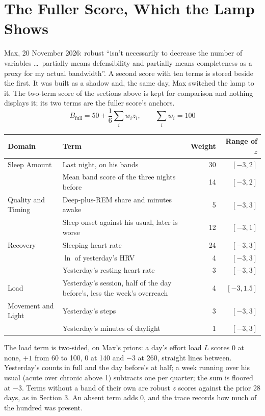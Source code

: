 \documentclass[11pt]{article}
\begin{document}
\section{The Fuller Score, Which the Lamp Shows}\label{sec:full}
Max, 20 November 2026: robust ``isn't necessarily to decrease the number of
variables \dots\ partially means defensibility and partially means completeness
as a proxy for my actual bandwidth''. A second score with ten terms is stored
beside the first. It was built as a shadow and, the same day, Max switched the
lamp to it. The two-term score of the sections above is kept for comparison and
nothing displays it; its two terms are the fuller score's anchors.
\begin{equation}
B_{\text{full}} = 50 + \frac{1}{6} \sum_i w_i z_i, \qquad \sum_i w_i = 100
\end{equation}
\begin{center}
\begin{tabular}{L{0.20\textwidth}L{0.47\textwidth}rr}
\toprule
Domain & Term & Weight & Range of $z$ \\
\midrule
Sleep Amount & Last night, on his bands & 30 & $[-3, 2]$ \\
 & Mean band score of the three nights before & 14 & $[-3, 2]$ \\
Quality and Timing & Deep-plus-REM share and minutes awake & 5 & $[-3, 3]$ \\
 & Sleep onset against his usual, later is worse & 12 & $[-3, 1]$ \\
Recovery & Sleeping heart rate & 24 & $[-3, 3]$ \\
 & $\ln$ of yesterday's HRV & 4 & $[-3, 3]$ \\
 & Yesterday's resting heart rate & 3 & $[-3, 3]$ \\
Load & Yesterday's session, half of the day before's, less the week's overreach & 4 & $[-3, 1.5]$ \\
Movement and Light & Yesterday's steps & 3 & $[-3, 3]$ \\
 & Yesterday's minutes of daylight & 1 & $[-3, 3]$ \\
\bottomrule
\end{tabular}
\end{center}
The load term is two-sided, on Max's priors: a day's effort load $L$ scores 0
at none, $+1$ from 60 to 100, 0 at 140 and $-3$ at 260, straight lines between.
Yesterday's counts in full and the day before's at half; a week running over
his usual (acute over chronic above 1) subtracts one per quarter; the sum is
floored at $-3$. Terms without a band of their own are robust $z$ scores against the prior 28
days, as in Section 3. An absent term adds 0, and the trace records how much of
the hundred was present.
\end{document}
